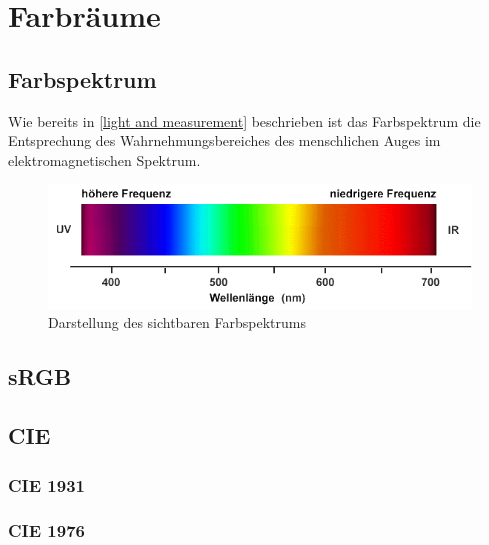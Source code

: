 \documentclass[11pt]{scrartcl}
\begin{document}
\section{Farbräume}
\subsection{Farbspektrum}
Wie bereits in \ref{light and measurement} beschrieben ist das Farbspektrum die Entsprechung des Wahrnehmungsbereiches des menschlichen
Auges im elektromagnetischen Spektrum.
\begin{figure}[H]
    \includegraphics[width=\textwidth]{images/farbspektrum.png}
    \caption{Darstellung des sichtbaren Farbspektrums \cite{fhtEsslignen}}
\end{figure}
\subsection{sRGB}
\subsection{CIE} \label{section_CIE}
\subsubsection{CIE 1931}
\subsubsection{CIE 1976}
\clearpage

\end{document}
